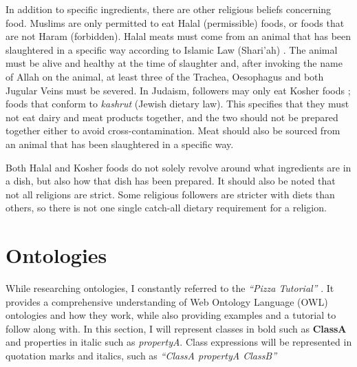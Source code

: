 In addition to specific ingredients, there are other religious beliefs concerning food. Muslims are only permitted to eat Halal (permissible) foods, or foods that are not Haram (forbidden). Halal meats must come from an animal that has been slaughtered in a specific way according to Islamic Law (Shari'ah) \cite{halal_monitoring_committee_2018}. The animal must be alive and healthy at the time of slaughter and, after invoking the name of Allah on the animal, at least three of the Trachea, Oesophagus and both Jugular Veins must be severed. In Judaism, followers may only eat Kosher foods \cite{kosher_2023} ; foods that conform to \textit{kashrut} (Jewish dietary law). This specifies that they must not eat dairy and meat products together, and the two should not be prepared together either to avoid cross-contamination. Meat should also be sourced from an animal that has been slaughtered in a specific way.

Both Halal and Kosher foods do not solely revolve around what ingredients are in a dish, but also how that dish has been prepared. It should also be noted that not all religions are strict. Some religious followers are stricter with diets than others, so there is not one single catch-all dietary requirement for a religion.


\section{Ontologies}

While researching ontologies, I constantly referred to the \textit{``Pizza Tutorial''} \cite{pizza_tutorial_site}. It provides a comprehensive understanding of Web Ontology Language (OWL) ontologies and how they work, while also providing examples and a tutorial to follow along with. In this section, I will represent classes in bold such as \textbf{ClassA} and properties in italic such as \textit{propertyA}. Class expressions will be represented in quotation marks and italics, such as \textit{``ClassA propertyA ClassB''}


